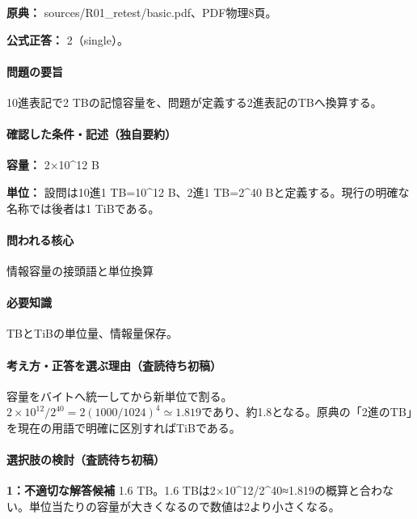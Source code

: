 \noindent\textbf{原典：} sources/R01\_retest/basic.pdf、PDF物理8頁。

\textbf{公式正答：} 2（single）。

\paragraph{問題の要旨} 10進表記で2 TBの記憶容量を、問題が定義する2進表記のTBへ換算する。

\paragraph{確認した条件・記述（独自要約）}\mbox{}\par

\noindent\textbf{容量：} 2×10\textasciicircum{}12 B\par

\noindent\textbf{単位：} 設問は10進1 TB=\allowbreak{}10\textasciicircum{}12 B、2進1 TB=\allowbreak{}2\textasciicircum{}40 Bと定義する。現行の明確な名称では後者は1 TiBである。\par

\paragraph{問われる核心} 情報容量の接頭語と単位換算

\paragraph{必要知識} TBとTiBの単位量、情報量保存。

\paragraph{考え方・正答を選ぶ理由（査読待ち初稿）} 容量をバイトへ統一してから新単位で割る。\(2\times10^{12}/2^{40}=2(1000/1024)^4\simeq1.819\)であり、約1.8となる。原典の「2進のTB」を現在の用語で明確に区別すればTiBである。

\paragraph{選択肢の検討（査読待ち初稿）}\mbox{}\par

\noindent\textbf{1：不適切な解答候補} 1.6 TB。1.6 TBは2×10\textasciicircum{}12/2\textasciicircum{}40≈1.819の概算と合わない。単位当たりの容量が大きくなるので数値は2より小さくなる。\par

